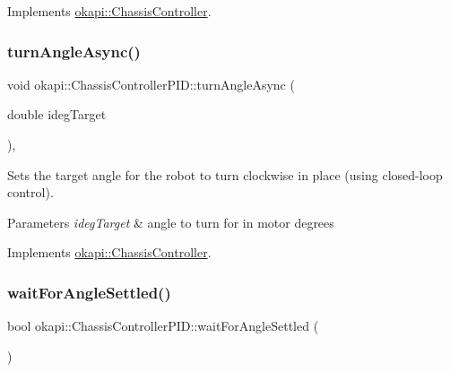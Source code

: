 Implements \mbox{\hyperlink{classokapi_1_1ChassisController_a87fc1f88bf06340d8f022a8c185b5e87}{okapi\+::\+Chassis\+Controller}}.

\mbox{\label{classokapi_1_1ChassisControllerPID_a3a16a11e8b0e11dbfb2a03b5685e509b}} 
\subsubsection{\texorpdfstring{turnAngleAsync()}{turnAngleAsync()}\hspace{0.1cm}{\footnotesize\ttfamily [2/2]}}
{\footnotesize\ttfamily void okapi\+::\+Chassis\+Controller\+P\+I\+D\+::turn\+Angle\+Async (\begin{DoxyParamCaption}\item[{double}]{ideg\+Target }\end{DoxyParamCaption})\hspace{0.3cm}{\ttfamily [override]}, {\ttfamily [virtual]}}

Sets the target angle for the robot to turn clockwise in place (using closed-\/loop control).


\begin{DoxyParams}{Parameters}
{\em ideg\+Target} & angle to turn for in motor degrees \\
\hline
\end{DoxyParams}


Implements \mbox{\hyperlink{classokapi_1_1ChassisController_a35cadd99478629637b4bd3a5e709871a}{okapi\+::\+Chassis\+Controller}}.

\mbox{\label{classokapi_1_1ChassisControllerPID_a736ca24bff70d502f5ff724ed88f9f62}} 
\subsubsection{\texorpdfstring{waitForAngleSettled()}{waitForAngleSettled()}}
{\footnotesize\ttfamily bool okapi\+::\+Chassis\+Controller\+P\+I\+D\+::wait\+For\+Angle\+Settled (\begin{DoxyParamCaption}{ }\end{DoxyParamCaption})\hspace{0.3cm}{\ttfamily [protected]}}

